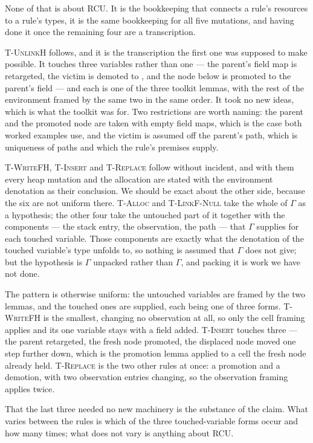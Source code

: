 None of that is about RCU.  It is the bookkeeping that connects a rule's
resources to a rule's types, it is the same bookkeeping for all five mutations,
and having done it once the remaining four are a transcription.

\textsc{T-UnlinkH} follows, and it is the transcription the first one was
supposed to make possible.  It touches three variables rather than one --- the
parent's field map is retargeted, the victim is demoted to \unlk{}, and the node
below is promoted to the parent's field --- and each is one of the three
toolkit lemmas, with the rest of the environment framed by the same two in the
same order.  It took no new ideas, which is what the toolkit was for.  Two
restrictions are worth naming: the parent and the promoted node are taken with
empty field maps, which is the case both worked examples use, and the victim is
assumed off the parent's path, which is uniqueness of paths and which the rule's
premises supply.

\textsc{T-WriteFH}, \textsc{T-Insert} and \textsc{T-Replace} follow without
incident, and with them every heap mutation and the allocation are stated with
the environment denotation as their conclusion.  We should be exact about the
other side, because the six are not uniform there.  \textsc{T-Alloc} and
\textsc{T-LinkF-Null} take the whole of $\Gamma$ as a hypothesis; the other four
take the untouched part of it together with the components --- the stack entry,
the observation, the path --- that $\Gamma$ supplies for each touched variable.
Those components are exactly what the denotation of the touched variable's type
unfolds to, so nothing is assumed that $\Gamma$ does not give; but the
hypothesis is $\Gamma$ unpacked rather than $\Gamma$, and packing it is work we
have not done.

The pattern is otherwise uniform: the untouched variables are framed by the two
lemmas, and the touched ones are supplied, each being one of three forms.  \textsc{T-WriteFH} is the smallest, changing no observation at
all, so only the cell framing applies and its one variable stays \frsh{} with a
field added.  \textsc{T-Insert} touches three --- the parent retargeted, the
fresh node promoted, the displaced node moved one step further down, which is
the promotion lemma applied to a cell the fresh node already held.
\textsc{T-Replace} is the two other rules at once: a promotion and a demotion,
with two observation entries changing, so the observation framing applies twice.

That the last three needed no new machinery is the substance of the claim.  What
varies between the rules is which of the three touched-variable forms occur and
how many times; what does not vary is anything about RCU.

